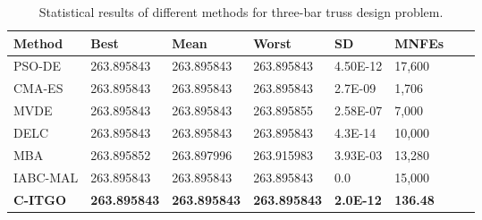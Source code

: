 
\begin{table*}[tp]
    \tiny
\begin{center}

\begin{tabular}{ P{2.0cm} P{2.0cm} P{2.0cm} P{2.0cm} P{2.0cm} P{2.0cm} P{2.0cm} P{2.0cm}  }
\hline
\textbf{Method} & \textbf{Best} & \textbf{Mean} & \textbf{Worst} & \textbf{SD} & \textbf{MNFEs} \\
\hline

PSO-DE & 263.895843 & 263.895843 & 263.895843 & 4.50E-12 & 17,600 \\
CMA-ES & 263.895843 & 263.895843 & 263.895843 & 2.7E-09 & 1,706 \\
MVDE & 263.895843 & 263.895843 & 263.895855 & 2.58E-07 & 7,000 \\
DELC & 263.895843 & 263.895843 & 263.895843 & 4.3E-14 & 10,000 \\
MBA & 263.895852 & 263.897996 & 263.915983 & 3.93E-03 & 13,280 \\
IABC-MAL & 263.895843 & 263.895843 & 263.895843 & 0.0 & 15,000 \\
\textbf{C-ITGO} & \bf{263.895843} & \bf{263.895843} & \bf{263.895843} & \bf{2.0E-12} & \bf{136.48} \\


\hline
\end{tabular}
\end{center}
\vspace*{-6mm}
\caption{Statistical results of different methods for three-bar truss design problem. \\[1em]}
\label{tab:TB}
\end{table*}

